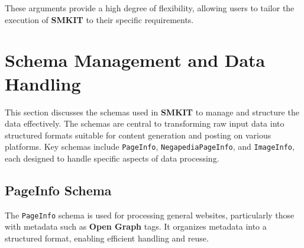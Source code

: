 These arguments provide a high degree of flexibility, allowing users to tailor the execution of \textbf{SMKIT} to their specific requirements.


\section{Schema Management and Data Handling}
\label{sec:schema_management_and_data_handling}
This section discusses the schemas used in \textbf{SMKIT} to manage and structure the data effectively. The schemas are central to transforming raw input data into structured formats suitable for content generation and posting on various platforms. Key schemas include \texttt{PageInfo}, \texttt{NegapediaPageInfo}, and \texttt{ImageInfo}, each designed to handle specific aspects of data processing.

\subsection{PageInfo Schema}
\label{subsec:pageinfo_schema}
The \texttt{PageInfo} schema is used for processing general websites, particularly those with metadata such as \textbf{Open Graph} tags. It organizes metadata into a structured format, enabling efficient handling and reuse.

